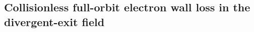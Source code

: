 %
%
\subsection{Collisionless full-orbit electron wall loss in the divergent-exit field}
\label{sec:wall-loss-v4}

